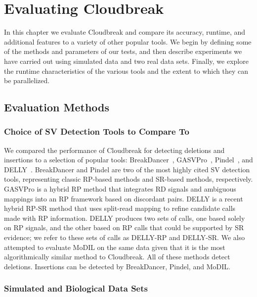 \chapter{Evaluating Cloudbreak}\label{chap_cloudbreak_eval}

In this chapter we evaluate Cloudbreak and compare its accuracy, runtime, and additional features to a variety of other popular tools. We begin by defining some of the methods and parameters of our tests, and then describe experiments we have carried out using simulated data and two real data sets. Finally, we explore the runtime characteristics of the various tools and the extent to which they can be parallelized.

\section{Evaluation Methods}

\subsection{Choice of SV Detection Tools to Compare To}

We compared the performance of Cloudbreak for detecting deletions and insertions to a selection of popular tools: BreakDancer~\cite{Chen:2009p3}, GASVPro~\cite{Sindi:2012kk}, Pindel~\cite{Ye:2009p2}, and DELLY~\cite{Rausch:2012he}. BreakDancer and Pindel are two of the most highly cited SV detection tools, representing classic RP-based methods and SR-based methods, respectively. GASVPro is a hybrid RP method that integrates RD signals and ambiguous mappings into an RP framework based on discordant pairs. DELLY is a recent hybrid RP-SR method that uses split-read mapping to refine candidate calls made with RP information. DELLY produces two sets of calls, one based solely on RP signals, and the other based on RP calls that could be supported by SR evidence; we refer to these sets of calls as DELLY-RP and DELLY-SR. We also attempted to evaluate MoDIL on the same data given that it is the most algorithmically similar method to Cloudbreak. All of these methods detect deletions. Insertions can be detected by BreakDancer, Pindel, and MoDIL. 

\subsection{Simulated and Biological Data Sets}\label{section_eval_data_sets}

